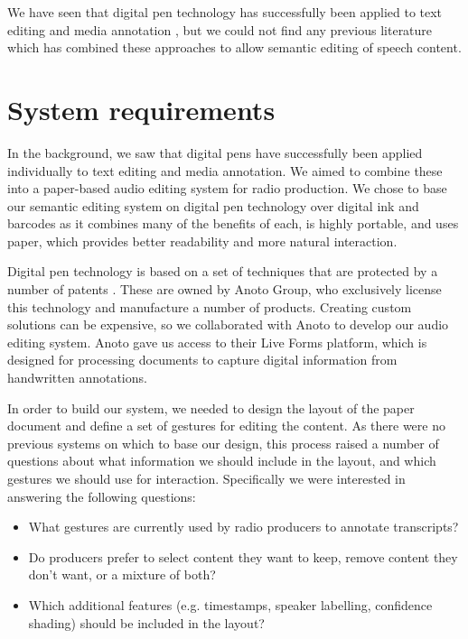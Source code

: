 We have seen that digital pen technology has successfully been applied to text editing \citep{Weibel2008} and media
annotation \citep{Fouse2011}, but we could not find any previous literature which has combined these approaches to
allow semantic editing of speech content.



\section{System requirements}\label{sec:paper-requirements}

In the background, we saw that digital pens have successfully been applied individually to text editing and media
annotation. We aimed to combine these into a paper-based audio editing system for radio production. We chose to base
our semantic editing system on digital pen technology over digital ink and barcodes as it combines many of the benefits
of each, is highly portable, and uses paper, which provides better readability and more natural interaction.

Digital pen technology is based on a set of techniques that are protected by a number of patents \citep{Fahraeus2003}.
These are owned by Anoto Group, who exclusively license this technology and manufacture a number of products. Creating
custom solutions can be expensive, so we collaborated with Anoto to develop our audio editing system.  Anoto gave us
access to their Live Forms platform, which is designed for processing documents to capture digital information from
handwritten annotations.

In order to build our system, we needed to design the layout of the paper document and define a set of gestures for
editing the content.  As there were no previous systems on which to base our design, this process raised a number of
questions about what information we should include in the layout, and which gestures we should use for interaction.
Specifically we were interested in answering the following questions:

{\singlespacing
  \begin{itemize}
    \item What gestures are currently used by radio producers to annotate transcripts?
    \item Do producers prefer to select content they want to keep, remove content they don't want, or a mixture of both?
    \item Which additional features (e.g. timestamps, speaker labelling, confidence shading) should be included in the
      layout?
  \end{itemize}
}

